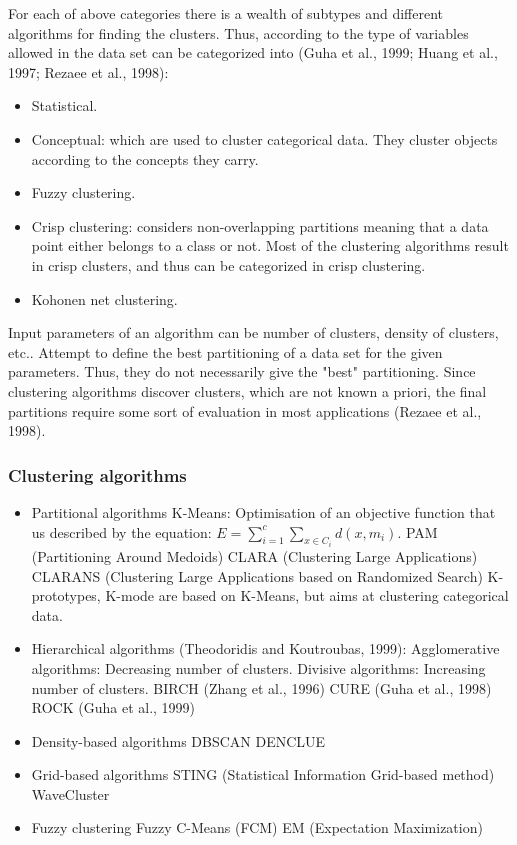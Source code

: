 \documentclass[a4paper,10pt]{article}
\begin{document}
For each of above categories there is a wealth of subtypes and different algorithms for finding the clusters. Thus, according to the type of variables allowed in the data set can be categorized into (Guha et al., 1999; Huang et al., 1997; Rezaee et al., 1998):
\begin{itemize}
	\item Statistical.
	\item Conceptual: which are used to cluster categorical data. They cluster objects according to the concepts they carry.
	\item Fuzzy clustering.
	\item Crisp clustering: considers non-overlapping partitions meaning that a data point either belongs to a class or not. Most of the clustering algorithms result in crisp clusters, and thus can be categorized in crisp clustering.
	\item Kohonen net clustering.
\end{itemize}
Input parameters of an algorithm can be number of clusters, density of clusters, etc.. Attempt to define the best partitioning of a data set for the given parameters. Thus, they do not necessarily give the "best" partitioning. Since clustering algorithms discover clusters, which are not known a priori, the final partitions require some sort of evaluation in most applications (Rezaee et al., 1998).

\subsubsection{Clustering algorithms}
\begin{itemize}
	\item Partitional algorithms
		\subitem K-Means: Optimisation of an objective function that us described by the equation: $E = \sum_{i = 1}^{c} \sum_{x \in C_{i}} d(x, m_{i})$.
		\subitem PAM (Partitioning Around Medoids)
		\subitem CLARA (Clustering Large Applications)
		\subitem CLARANS (Clustering Large Applications based on Randomized Search)
		\subitem K-prototypes, K-mode are based on K-Means, but aims at clustering categorical data.
	\item Hierarchical algorithms (Theodoridis and Koutroubas, 1999):
		\subitem Agglomerative algorithms: Decreasing number of clusters.
		\subitem Divisive algorithms: Increasing number of clusters.
		\subitem BIRCH (Zhang et al., 1996)
		\subitem CURE (Guha et al., 1998)
		\subitem ROCK (Guha et al., 1999)
	\item Density-based algorithms
		\subitem DBSCAN
		\subitem DENCLUE
	\item Grid-based algorithms
		\subitem STING (Statistical Information Grid-based method)
		\subitem WaveCluster
	\item Fuzzy clustering
		\subitem Fuzzy C-Means (FCM)
		\subitem EM (Expectation Maximization)
\end{itemize}
\end{document}
